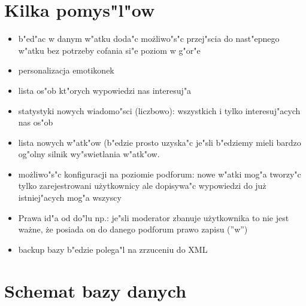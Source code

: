 \documentclass[12pt,a4paper,twoside]{article}
\begin{document}
\section{Kilka pomys"l"ow}

\begin{itemize}
\item b"ed"ac w danym w"atku doda"c mo\.zliwo"s"c przej"scia do nast"epnego w"atku bez potrzeby cofania si"e poziom w g"or"e
\item personalizacja emotikonek
\item lista os"ob kt"orych wypowiedzi nas interesuj"a
\item statystyki nowych wiadomo"sci (liczbowo): wszystkich i tylko interesuj"acych nas os"ob
\item lista nowych w"atk"ow (b"edzie prosto uzyska"c je"sli b"edziemy mieli bardzo og"olny silnik wy"swietlania w"atk"ow.
\item mo\.zliwo"s"c konfiguracji na poziomie podforum: nowe w"atki mog"a tworzy"c tylko zarejestrowani u\.zytkownicy ale dopisywa"c wypowiedzi do ju\.z istniej"acych mog"a wszyscy
\item Prawa id"a od do"lu np.: je"sli moderator zbanuje u\.zytkownika to nie jest wa\.zne, \.ze posiada on do danego podforum prawo zapisu (''w'') 
\item backup bazy b"edzie polega"l na zrzuceniu do XML
\end{itemize}

\section{Schemat bazy danych}
\end{document}
